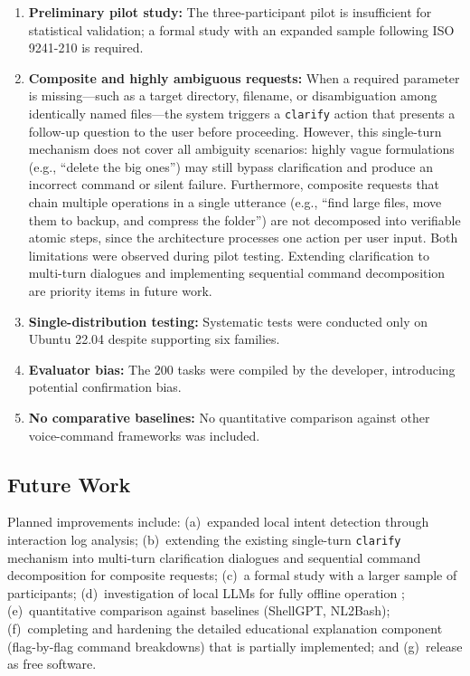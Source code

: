 \documentclass[10pt,a4paper]{article}
\begin{document}
\begin{enumerate}[noitemsep,topsep=0pt]
    \item \textbf{Preliminary pilot study:} The three-participant pilot is insufficient for statistical validation; a formal study with an expanded sample following ISO 9241-210 \citep{ISO9241} is required.
    \item \textbf{Composite and highly ambiguous requests:} When a required parameter is missing---such as a target directory, filename, or disambiguation among identically named files---the system triggers a \texttt{clarify} action that presents a follow-up question to the user before proceeding. However, this single-turn mechanism does not cover all ambiguity scenarios: highly vague formulations (e.g., ``delete the big ones'') may still bypass clarification and produce an incorrect command or silent failure. Furthermore, composite requests that chain multiple operations in a single utterance (e.g., ``find large files, move them to backup, and compress the folder'') are not decomposed into verifiable atomic steps, since the architecture processes one action per user input. Both limitations were observed during pilot testing. Extending clarification to multi-turn dialogues and implementing sequential command decomposition are priority items in future work.
    \item \textbf{Single-distribution testing:} Systematic tests were conducted only on Ubuntu 22.04 despite supporting six families.
    \item \textbf{Evaluator bias:} The 200 tasks were compiled by the developer, introducing potential confirmation bias.
    \item \textbf{No comparative baselines:} No quantitative comparison against other voice-command frameworks was included.
\end{enumerate}

\subsection{Future Work}
\label{subsec:future-work}

Planned improvements include: (a)~expanded local intent detection through interaction log analysis; (b)~extending the existing single-turn \texttt{clarify} mechanism into multi-turn clarification dialogues and sequential command decomposition for composite requests; (c)~a formal study with a larger sample of participants; (d)~investigation of local LLMs for fully offline operation \citep{DeepSeek2025}; (e)~quantitative comparison against baselines (ShellGPT, NL2Bash); (f)~completing and hardening the detailed educational explanation component (flag-by-flag command breakdowns) that is partially implemented; and (g)~release as free software.
\end{document}
